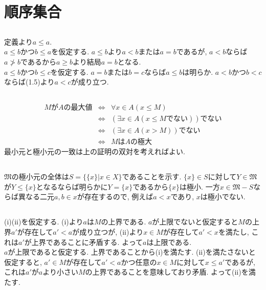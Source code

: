 \documentclass{jsarticle}
\begin{document}
\section{順序集合} %
\subsection{} %
定義より$a \le a$.\\
$a \le b$かつ$b \le a$を仮定する. $a \le b$より$a < b$または$a = b$であるが, $a < b$ならば$a \not> b$であるから$a \ge b$より結局$a = b$となる.\\
$a \le b$かつ$b \le c$を仮定する. $a = b$または$b = c$ならば$a \le b$は明らか. $a < b$かつ$b < c$ならば(1.5)より$a < c$が成り立つ.

\subsection{} %
\begin{eqnarray*}
	MがAの最大値
	&\Leftrightarrow& \forall{x \in A}(x \le M)\\
	&\Leftrightarrow& (\exists{x \in A}(x \le M でない))でない\\
	&\Leftrightarrow& (\exists{x \in A}(x > M))でない\\
	&\Leftrightarrow& MはAの極大
\end{eqnarray*}
最小元と極小元の一致は上の証明の双対を考えればよい.

\subsection{} %
$\mathfrak{M}$の極小元の全体は$S = \{\{x\} | x \in X\}$であることを示す. $\{x\} \in S$に対して$Y \in \mathfrak{M}$が$Y \le \{x\}$となるならば明らかに$Y = \{x\}$であるから$\{x\}$は極小. 一方$x \in \mathfrak{M} - S$ならば異なる二元$a, b \in x$が存在するので, 例えば${a} < x$であり, $x$は極小でない.

\subsection{} %
(i)(ii)を仮定する. (i)より$a$は$M$の上界である. $a$が上限でないと仮定すると$M$の上界$a'$が存在して$a' < a$が成り立つが, (ii)より$x \in M$が存在して$a' < x$を満たし, これは$a'$が上界であることに矛盾する. よって$a$は上限である.\\
$a$が上限であると仮定する. 上界であることから(i)を満たす. (ii)を満たさないと仮定すると, $a' \in M$が存在して$a' < a$かつ任意の$x \in M$に対して$x \le a'$であるが, これは$a'$が$a$より小さい$M$の上界であることを意味しており矛盾. よって(ii)を満たす.
\end{document}
